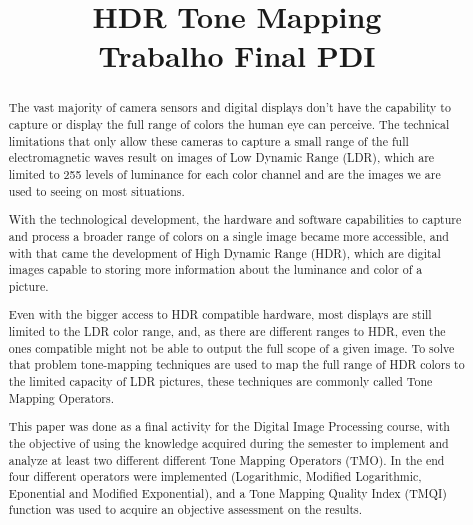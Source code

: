 \documentclass[conference]{IEEEtran}
\begin{document}
\title{HDR Tone Mapping\\{\LARGE Trabalho Final PDI}}

\author{
\and
{}
}

\maketitle

\begin{abstract}
The vast majority of camera sensors and digital displays don't have the capability to capture or display the full range of colors the human eye can perceive. The technical limitations that only allow these cameras to capture a small range of the full electromagnetic waves result on images of Low Dynamic Range (LDR), which are limited to 255 levels of luminance for each color channel and are the images we are used to seeing on most situations.

With the technological development, the hardware and software capabilities to capture and process a broader range of colors on a single image became more accessible, and with that came the development of High Dynamic Range (HDR), which are digital images capable to storing more information about the luminance and color of a picture.

Even with the bigger access to HDR compatible hardware, most displays are still limited to the LDR color range, and, as there are different ranges to HDR, even the ones compatible might not be able to output the full scope of a given image. To solve that problem tone-mapping techniques are used to map the full range of HDR colors to the limited capacity of LDR pictures, these techniques are commonly called Tone Mapping Operators.

This paper was done as a final activity for the Digital Image Processing course, with the objective of using the knowledge acquired during the semester to implement and analyze at least two different different Tone Mapping Operators (TMO). In the end four different operators were implemented (Logarithmic, Modified Logarithmic, Eponential and Modified Exponential), and a Tone Mapping Quality Index (TMQI) function was used to acquire an objective assessment on the results.
\end{abstract}
\end{document}
